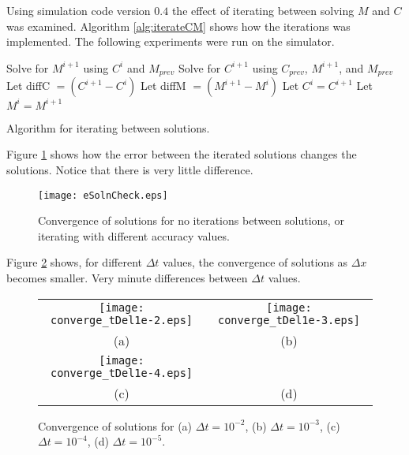   Using simulation code version $0.4$ the effect of iterating between solving $M$ and $C$ was examined. Algorithm \ref{alg:iterateCM} shows how the iterations was implemented. The following experiments were run on the simulator.
  
  \begin{algorithm}[h!tb]
      \dontprintsemicolon
      \Begin
      {
        \SetLine
        {
            Solve for $M^{i+1}$ using $C^{i}$ and $M_{prev}$\;
            Solve for $C^{i+1}$ using $C_{prev}$, $M^{i+1}$, and $M_{prev}$\;
            Let diffC $=  (C^{i+1} - C^i)$\;
            Let diffM $= (M^{i+1} - M^i)$\;
            Let $C^{i} = C^{i+1}$\;
            Let $M^{i} = M^{i+1}$\;
        }
      }
      \caption{Algorithm for iterating between solutions.}
      \label{alg:iterateCM}
    \end{algorithm}
  
  Figure \ref{fig:iterateAccuracy} shows how the error between the iterated solutions changes the solutions. Notice that there is very little difference.
  
  \begin{figure}[h!tb]
    \begin{center}
      \texttt{[image: eSolnCheck.eps]}
      \caption{Convergence of solutions for no iterations between solutions, or iterating with different accuracy values.}
      \label{fig:iterateAccuracy}
    \end{center}
  \end{figure}
  
    
  Figure \ref{fig:convergeDelt} shows, for different $\Delta t$ values, the convergence of solutions as $\Delta x$ becomes smaller. Very minute differences between $\Delta t$ values.
  
  \begin{figure}[h!tb]
    \begin{center}
      \begin{tabular}{c c}
          \texttt{[image: converge\_tDel1e-2.eps]} &
          \texttt{[image: converge\_tDel1e-3.eps]} \\
          (a) & (b) \\
          \texttt{[image: converge\_tDel1e-4.eps]} & \\
          (c) & (d)
      \end{tabular}
      \caption{Convergence of solutions for (a) $\Delta t = 10^{-2}$, (b) $\Delta t = 10^{-3}$, (c) $\Delta t = 10^{-4}$, (d) $\Delta t = 10^{-5}$.}
      \label{fig:convergeDelt}
    \end{center}
  \end{figure}
  
